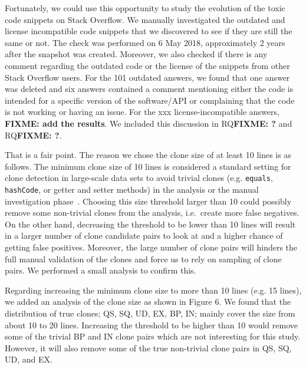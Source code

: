 \documentclass[a4paper,twoside,10pt]{reviewresponse}
\newcommand\FIXME[1]{{\color{red}\textbf{FIXME: #1}}}
\begin{document}
Fortunately, we could use this opportunity to study the evolution of the toxic code snippets on Stack Overflow. We manually investigated the outdated and license incompatible code snippets that we discovered to see if they are still the same or not. The check was performed on 6 May 2018, approximately 2 years after the snapshot was created. Moreover, we also checked if there is any comment regarding the outdated code or the license of the snippets from other Stack Overflow users. For the 101 outdated answers, we found that one answer was deleted and six answers contained a comment mentioning either the code is intended for a specific version of the software/API or complaining that the code is not working or having an issue. 
For the xxx license-incompatible answers, \FIXME{add the results}.
We included this discussion in RQ\FIXME{?} and RQ\FIXME{?}.


That is a fair point. The reason we chose the clone size of at least 10 lines is as follows. The minimum clone size of 10 lines is considered a standard setting for clone detection in large-scale data sets to avoid trivial clones (e.g. \texttt{equals}, \texttt{hashCode}, or getter and setter methods) in the analysis or the manual investigation phase~\citep{Sajnani2016}. 
Choosing this size threshold larger than 10 could possibly remove some non-trivial clones from the analysis, i.e.~create more false negatives.
On the other hand, decreasing the threshold to be lower than 10 lines will result in a larger number of clone candidate pairs to look at and a higher chance of getting false positives. Moreover, the large number of clone pairs will hinders the full manual validation of the clones and force us to rely on sampling of clone pairs. We performed a small analysis to confirm this.

Regarding increasing the minimum clone size to more than 10 lines (e.g. 15 lines), we added an analysis of the clone size as shown in Figure 6. We found that the distribution of true clones; QS, SQ, UD, EX, BP, IN; mainly cover the size from about 10 to 20 lines. Increasing the threshold to be higher than 10 would remove some of the trivial BP and IN clone pairs which are not interesting for this study. However, it will also remove some of the true non-trivial clone pairs in QS, SQ, UD, and EX.
\end{document}

